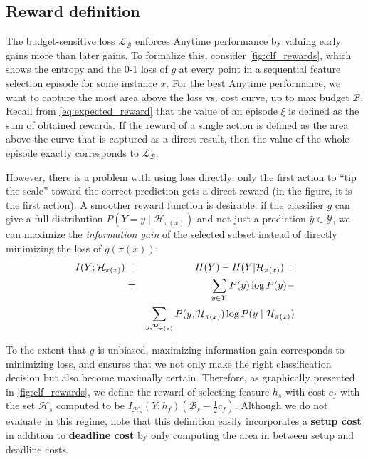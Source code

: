 \subsection{Reward definition}\label{sec:clf_reward}



The budget-sensitive loss $\mathcal{L}_\mathcal{B}$ enforces Anytime performance by valuing early gains more than later gains.
To formalize this, consider \autoref{fig:clf_rewards}, which shows the entropy and the 0-1 loss of $g$ at every point in a sequential feature selection episode for some instance $x$.
For the best Anytime performance, we want to capture the most area above the loss vs. cost curve, up to max budget $\mathcal{B}$.
Recall from \eqref{eq:expected_reward} that the value of an episode $\xi$ is defined as the sum of obtained rewards.
If the reward of a single action is defined as the area above the curve that is captured as a direct result, then the value of the whole episode exactly corresponds to $\mathcal{L}_\mathcal{B}$.

However, there is a problem with using loss directly: only the first action to ``tip the scale'' toward the correct prediction gets a direct reward (in the figure, it is the first action).
A smoother reward function is desirable: if the classifier $g$ can give a full distribution $P(Y = y \mid \mathcal{H}_{\pi(x)})$ and not just a prediction $\hat{y} \in \mathcal{Y}$, we can maximize the \emph{information gain} of the selected subset instead of directly minimizing the loss of $g(\pi(x))$:
\begin{eqnarray}
I(Y; \mathcal{H}_{\pi(x)}) &=& H(Y) - H(Y | \mathcal{H}_{\pi(x)}) = \\ \notag
&=& \sum_{y \in Y} P(y) \log P(y) - \\ \notag
&&\sum_{y, \mathcal{H}_{\pi(x)}} P(y, \mathcal{H}_{\pi(x)}) \log P(y \mid \mathcal{H}_{\pi(x)})
\end{eqnarray}

To the extent that $g$ is unbiased, maximizing information gain corresponds to minimizing loss, and ensures that we not only make the right classification decision but also become maximally certain.
Therefore, as graphically presented in \autoref{fig:clf_rewards}, we define the reward of selecting feature $h_s$ with cost $c_f$ with the set $\mathcal{H}_s$ computed to be $I_{\mathcal{H}_s}(Y; h_f) (\mathcal{B}_s - \frac{1}{2}c_f)$.
Although we do not evaluate in this regime, note that this definition easily incorporates a \textbf{setup cost} in addition to \textbf{deadline cost} by only computing the area in between setup and deadline costs.
